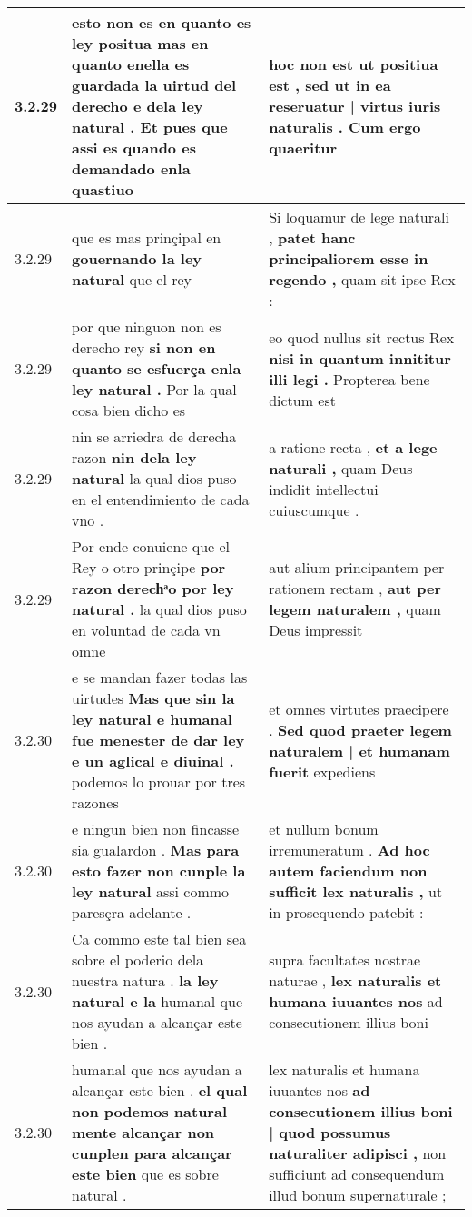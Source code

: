 \begin{tabular}{|p{1cm}|p{6.5cm}|p{6.5cm}|}
3.2.29 & esto non es en quanto es ley positua \textbf{ mas en quanto enella es guardada la uirtud del derecho e dela ley natural . } Et pues que assi es quando es demandado enla quastiuo & hoc non est ut positiua est , \textbf{ sed ut in ea reseruatur | virtus iuris naturalis . } Cum ergo quaeritur \\\hline
3.2.29 & que es mas prinçipal en \textbf{ gouernando la ley natural } que el rey & Si loquamur de lege naturali , \textbf{ patet hanc principaliorem esse in regendo , } quam sit ipse Rex : \\\hline
3.2.29 & por que ninguon non es derecho rey \textbf{ si non en quanto se esfuerça enla ley natural . } Por la qual cosa bien dicho es & eo quod nullus sit rectus Rex \textbf{ nisi in quantum innititur illi legi . } Propterea bene dictum est \\\hline
3.2.29 & nin se arriedra de derecha razon \textbf{ nin dela ley natural } la qual dios puso en el entendimiento de cada vno . & a ratione recta , \textbf{ et a lege naturali , } quam Deus indidit intellectui cuiuscumque . \\\hline
3.2.29 & Por ende conuiene que el Rey o otro prinçipe \textbf{ por razon derechͣo por ley natural . } la qual dios puso en voluntad de cada vn omne & aut alium principantem per rationem rectam , \textbf{ aut per legem naturalem , } quam Deus impressit \\\hline
3.2.30 & e se mandan fazer todas las uirtudes \textbf{ Mas que sin la ley natural e humanal fue menester de dar ley e un aglical e diuinal . } podemos lo prouar por tres razones & et omnes virtutes praecipere . \textbf{ Sed quod praeter legem naturalem | et humanam fuerit } expediens \\\hline
3.2.30 & e ningun bien non fincasse sia gualardon . \textbf{ Mas para esto fazer non cunple la ley natural } assi commo paresçra adelante . & et nullum bonum irremuneratum . \textbf{ Ad hoc autem faciendum non sufficit lex naturalis , } ut in prosequendo patebit : \\\hline
3.2.30 & Ca commo este tal bien sea sobre el poderio dela nuestra natura . \textbf{ la ley natural e la } humanal que nos ayudan a alcançar este bien . & supra facultates nostrae naturae , \textbf{ lex naturalis et humana iuuantes nos } ad consecutionem illius boni \\\hline
3.2.30 & humanal que nos ayudan a alcançar este bien . \textbf{ el qual non podemos natural mente alcançar non cunplen para alcançar este bien } que es sobre natural . & lex naturalis et humana iuuantes nos \textbf{ ad consecutionem illius boni | quod possumus naturaliter adipisci , } non sufficiunt ad consequendum illud bonum supernaturale ; \\\hline

\end{tabular}
